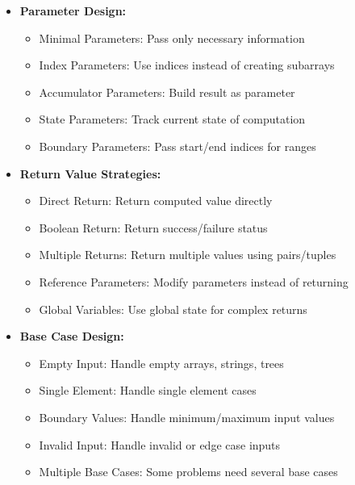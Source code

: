 \documentclass[a4paper,10pt]{book}
\begin{document}
\begin{itemize}[leftmargin=*]
    \item \textbf{Parameter Design:}
    \begin{itemize}
        \item Minimal Parameters: Pass only necessary information
        \item Index Parameters: Use indices instead of creating subarrays
        \item Accumulator Parameters: Build result as parameter
        \item State Parameters: Track current state of computation
        \item Boundary Parameters: Pass start/end indices for ranges
    \end{itemize}

    \item \textbf{Return Value Strategies:}
    \begin{itemize}
        \item Direct Return: Return computed value directly
        \item Boolean Return: Return success/failure status
        \item Multiple Returns: Return multiple values using pairs/tuples
        \item Reference Parameters: Modify parameters instead of returning
        \item Global Variables: Use global state for complex returns
    \end{itemize}

    \item \textbf{Base Case Design:}
    \begin{itemize}
        \item Empty Input: Handle empty arrays, strings, trees
        \item Single Element: Handle single element cases
        \item Boundary Values: Handle minimum/maximum input values
        \item Invalid Input: Handle invalid or edge case inputs
        \item Multiple Base Cases: Some problems need several base cases
    \end{itemize}
\end{itemize}
\end{document}

